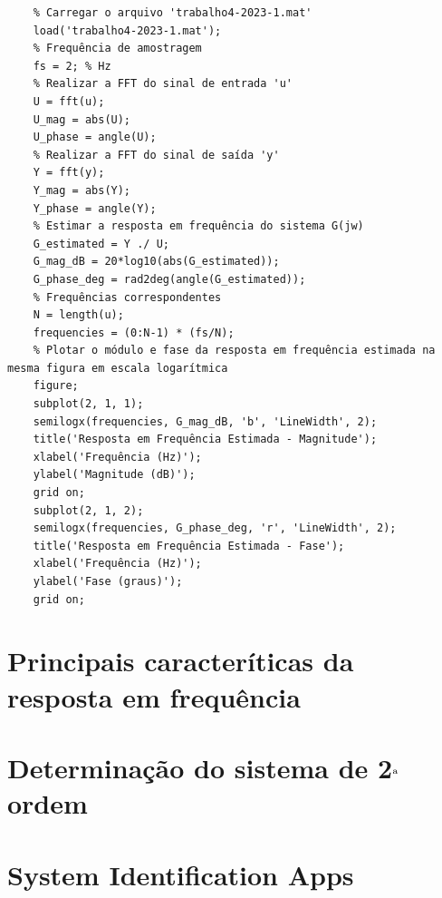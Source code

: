\documentclass[10pt]{article}
\begin{document}
\small
\begin{verbatim}
    % Carregar o arquivo 'trabalho4-2023-1.mat'
    load('trabalho4-2023-1.mat');
    % Frequência de amostragem
    fs = 2; % Hz
    % Realizar a FFT do sinal de entrada 'u'
    U = fft(u);
    U_mag = abs(U);
    U_phase = angle(U);
    % Realizar a FFT do sinal de saída 'y'
    Y = fft(y);
    Y_mag = abs(Y);
    Y_phase = angle(Y);
    % Estimar a resposta em frequência do sistema G(jw)
    G_estimated = Y ./ U;
    G_mag_dB = 20*log10(abs(G_estimated));
    G_phase_deg = rad2deg(angle(G_estimated));
    % Frequências correspondentes
    N = length(u);
    frequencies = (0:N-1) * (fs/N);
    % Plotar o módulo e fase da resposta em frequência estimada na mesma figura em escala logarítmica
    figure;
    subplot(2, 1, 1);
    semilogx(frequencies, G_mag_dB, 'b', 'LineWidth', 2);
    title('Resposta em Frequência Estimada - Magnitude');
    xlabel('Frequência (Hz)');
    ylabel('Magnitude (dB)');
    grid on;
    subplot(2, 1, 2);
    semilogx(frequencies, G_phase_deg, 'r', 'LineWidth', 2);
    title('Resposta em Frequência Estimada - Fase');
    xlabel('Frequência (Hz)');
    ylabel('Fase (graus)');
    grid on; 
\end{verbatim}

\section{Principais caracteríticas da resposta em frequência}

\newpage

\section{Determinação do sistema de 2$\textsuperscript{a}$ ordem}

\section{System Identification Apps}
\end{document}
